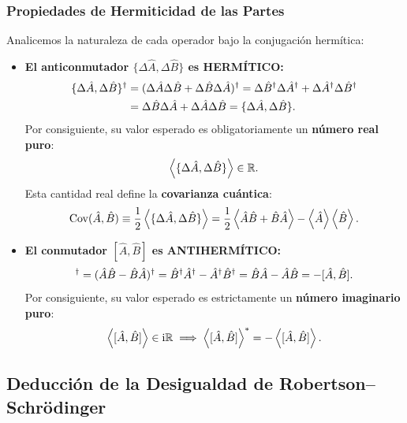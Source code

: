\subsubsection{Propiedades de Hermiticidad de las Partes}
Analicemos la naturaleza de cada operador bajo la conjugación hermítica:
\begin{itemize}
    \item \textbf{El anticonmutador $\{\Delta\hat{A}, \Delta\hat{B}\}$ es HERMÍTICO:}
    \begin{align}
        \{\Delta\hat{A}, \Delta\hat{B}\}^\dagger &= (\Delta\hat{A}\Delta\hat{B} + \Delta\hat{B}\Delta\hat{A})^\dagger = \Delta\hat{B}^\dagger\Delta\hat{A}^\dagger + \Delta\hat{A}^\dagger\Delta\hat{B}^\dagger \nonumber\\
        &= \Delta\hat{B}\Delta\hat{A} + \Delta\hat{A}\Delta\hat{B} = \{\Delta\hat{A}, \Delta\hat{B}\}.
    \end{align}
    Por consiguiente, su valor esperado es obligatoriamente un \textbf{número real puro}:
    \begin{equation}
        \left\langle \{\Delta\hat{A}, \Delta\hat{B}\} \right\rangle \in \mathbb{R}.
    \end{equation}
    Esta cantidad real define la \textbf{covarianza cuántica}:
    \begin{equation}
        \mathrm{Cov}(\hat{A}, \hat{B}) \equiv \frac{1}{2}\left\langle \{\Delta\hat{A}, \Delta\hat{B}\} \right\rangle = \frac{1}{2}\left\langle \hat{A}\hat{B} + \hat{B}\hat{A} \right\rangle - \left\langle \hat{A} \right\rangle\left\langle \hat{B} \right\rangle.
    \end{equation}
    
    \item \textbf{El conmutador $[\hat{A}, \hat{B}]$ es ANTIHERMÍTICO:}
    \begin{equation}
        [\hat{A}, \hat{B}]\adj = (\hat{A}\hat{B} - \hat{B}\hat{A})\adj = \hat{B}\adj\hat{A}\adj - \hat{A}\adj\hat{B}\adj = \hat{B}\hat{A} - \hat{A}\hat{B} = -[\hat{A}, \hat{B}].
    \end{equation}
    Por consiguiente, su valor esperado es estrictamente un \textbf{número imaginario puro}:
    \begin{equation}
        \left\langle [\hat{A}, \hat{B}] \right\rangle \in \mathrm{i}\mathbb{R} \implies \left\langle [\hat{A}, \hat{B}] \right\rangle^* = -\left\langle [\hat{A}, \hat{B}] \right\rangle.
    \end{equation}
\end{itemize}

\subsection{Deducción de la Desigualdad de Robertson--\texorpdfstring{Schrödinger}{Schrodinger}}

